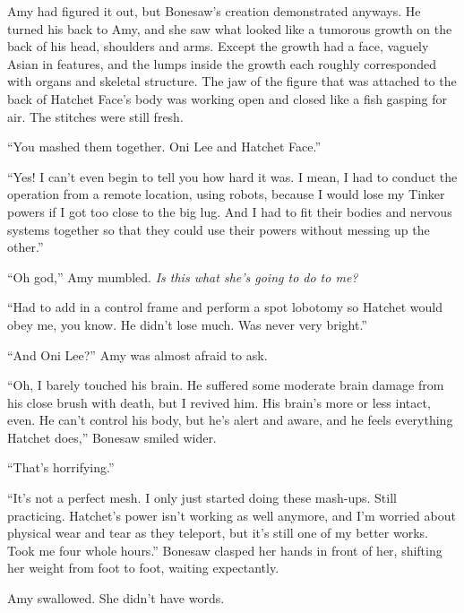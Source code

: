 Amy had figured it out, but Bonesaw's creation demonstrated anyways.  He turned his back to Amy, and she saw what looked like a tumorous growth on the back of his head, shoulders and arms.  Except the growth had a face, vaguely Asian in features, and the lumps inside the growth each roughly corresponded with organs and skeletal structure.  The jaw of the figure that was attached to the back of Hatchet Face's body was working open and closed like a fish gasping for air.  The stitches were still fresh.



``You mashed them together.  Oni Lee and Hatchet Face.''



``Yes!  I can't even begin to tell you how hard it was.  I mean, I had to conduct the operation from a remote location, using robots, because I would lose my Tinker powers if I got too close to the big lug.  And I had to fit their bodies and nervous systems together so that they could use their powers without messing up the other.''



``Oh god,'' Amy mumbled.  \emph{Is this what she's going to do to me?}



``Had to add in a control frame and perform a spot lobotomy so Hatchet would obey me, you know.  He didn't lose much.  Was never very bright.''



``And Oni Lee?'' Amy was almost afraid to ask.



``Oh, I barely touched his brain.  He suffered some moderate brain damage from his close brush with death, but I revived him.  His brain's more or less intact, even.  He can't control his body, but he's alert and aware, and he feels everything Hatchet does,'' Bonesaw smiled wider.



``That's horrifying.''



``It's not a perfect mesh.  I only just started doing these mash-ups.  Still practicing.  Hatchet's power isn't working as well anymore, and I'm worried about physical wear and tear as they teleport, but it's still one of my better works.  Took me four whole hours.''  Bonesaw clasped her hands in front of her, shifting her weight from foot to foot, waiting expectantly.



Amy swallowed.  She didn't have words.



